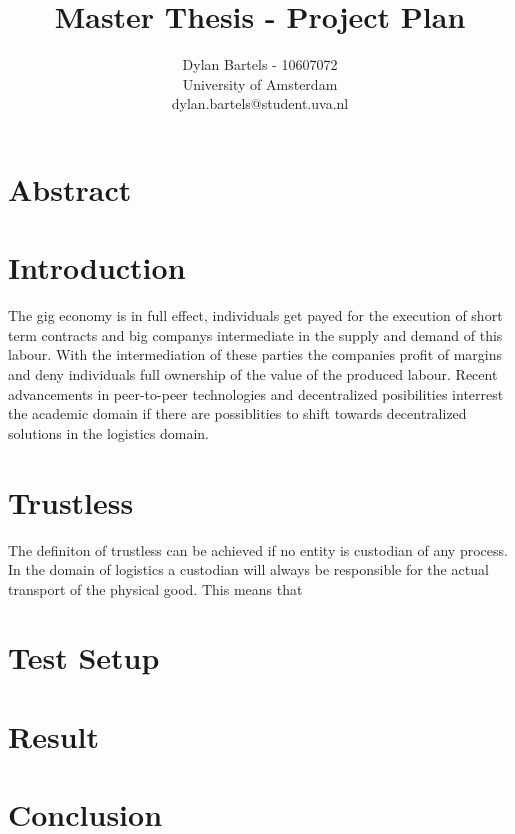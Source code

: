 \documentclass[11pt]{article}
\begin{document}
\title{Master Thesis - Project Plan}
\author{Dylan Bartels - 10607072\\University of Amsterdam \\dylan.bartels@student.uva.nl}
\maketitle

\section{Abstract}

\section{Introduction}

The gig economy is in full effect, individuals get payed for the execution of short term contracts and big companys intermediate in the supply and demand of this labour. With the intermediation of these parties the companies profit of margins and deny individuals full ownership of the value of the produced labour. Recent advancements in peer-to-peer technologies and decentralized posibilities interrest the academic domain if there are possiblities to shift towards decentralized solutions in the logistics domain\cite{research_demand}\cite{research_demand}\cite{research_demand}.\par

\section{Trustless}

The definiton of trustless can be achieved if no entity is custodian of any process. In the domain of logistics a custodian will always be responsible for the actual transport of the physical good. This means that

\section{Test Setup}

\section{Result}

\section{Conclusion}



\end{document}
